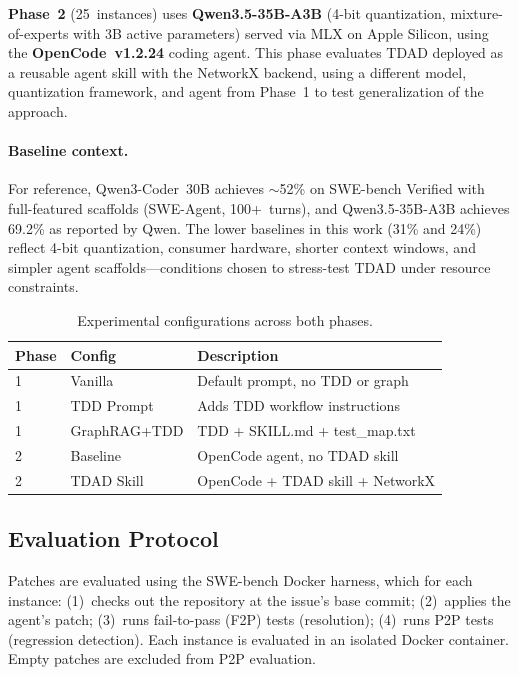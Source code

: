 \documentclass[sigconf,nonacm]{acmart}
\begin{document}
\textbf{Phase~2} (25~instances) uses \textbf{Qwen3.5-35B-A3B} (4-bit
quantization, mixture-of-experts with 3B active parameters) served via MLX
on Apple Silicon, using the \textbf{OpenCode~v1.2.24} coding agent.  This
phase evaluates \textsc{TDAD} deployed as a reusable agent skill with the
NetworkX backend, using a different model, quantization framework, and agent
from Phase~1 to test generalization of the approach.

\paragraph{Baseline context.}
For reference, Qwen3-Coder~30B achieves ${\sim}$52\% on SWE-bench Verified
with full-featured scaffolds (SWE-Agent, 100+~turns), and Qwen3.5-35B-A3B
achieves 69.2\% as reported by Qwen.  The lower baselines in this work
(31\% and 24\%) reflect 4-bit quantization, consumer hardware, shorter
context windows, and simpler agent scaffolds---conditions chosen to
stress-test \textsc{TDAD} under resource constraints.

\begin{table}[t]
\caption{Experimental configurations across both phases.}
\label{tab:configs}
\small
\begin{tabular}{@{}llp{3.8cm}@{}}
\toprule
\textbf{Phase} & \textbf{Config} & \textbf{Description} \\
\midrule
1 & Vanilla     & Default prompt, no TDD or graph \\
1 & TDD Prompt  & Adds TDD workflow instructions \\
1 & GraphRAG+TDD & TDD + SKILL.md + test\_map.txt \\
\midrule
2 & Baseline    & OpenCode agent, no TDAD skill \\
2 & TDAD Skill  & OpenCode + TDAD skill + NetworkX \\
\bottomrule
\end{tabular}
\end{table}

\subsection{Evaluation Protocol}

Patches are evaluated using the SWE-bench Docker harness, which for each
instance: (1)~checks out the repository at the issue's base commit;
(2)~applies the agent's patch; (3)~runs fail-to-pass (F2P) tests (resolution);
(4)~runs P2P tests (regression detection).  Each instance is evaluated in
an isolated Docker container.  Empty patches are excluded from P2P evaluation.
\end{document}
